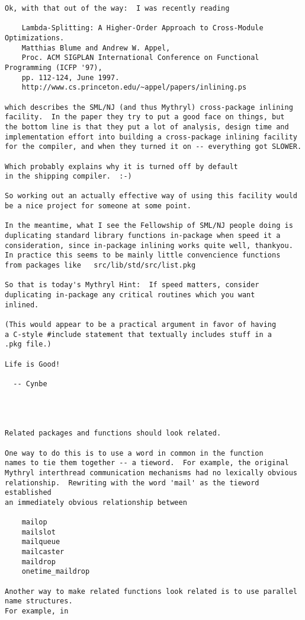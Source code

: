\begin{verbatim}
Ok, with that out of the way:  I was recently reading

    Lambda-Splitting: A Higher-Order Approach to Cross-Module Optimizations.
    Matthias Blume and Andrew W. Appel,
    Proc. ACM SIGPLAN International Conference on Functional Programming (ICFP '97),
    pp. 112-124, June 1997.
    http://www.cs.princeton.edu/~appel/papers/inlining.ps

which describes the SML/NJ (and thus Mythryl) cross-package inlining
facility.  In the paper they try to put a good face on things, but
the bottom line is that they put a lot of analysis, design time and
implementation effort into building a cross-package inlining facility
for the compiler, and when they turned it on -- everything got SLOWER.

Which probably explains why it is turned off by default
in the shipping compiler.  :-)

So working out an actually effective way of using this facility would
be a nice project for someone at some point.

In the meantime, what I see the Fellowship of SML/NJ people doing is
duplicating standard library functions in-package when speed it a
consideration, since in-package inlining works quite well, thankyou.
In practice this seems to be mainly little convencience functions
from packages like   src/lib/std/src/list.pkg

So that is today's Mythryl Hint:  If speed matters, consider
duplicating in-package any critical routines which you want
inlined.

(This would appear to be a practical argument in favor of having
a C-style #include statement that textually includes stuff in a
.pkg file.)

Life is Good!

  -- Cynbe




Related packages and functions should look related.

One way to do this is to use a word in common in the function
names to tie them together -- a tieword.  For example, the original
Mythryl interthread communication mechanisms had no lexically obvious
relationship.  Rewriting with the word 'mail' as the tieword established
an immediately obvious relationship between

    mailop
    mailslot
    mailqueue
    mailcaster
    maildrop
    onetime_maildrop

Another way to make related functions look related is to use parallel name structures.
For example, in


\end{verbatim}
